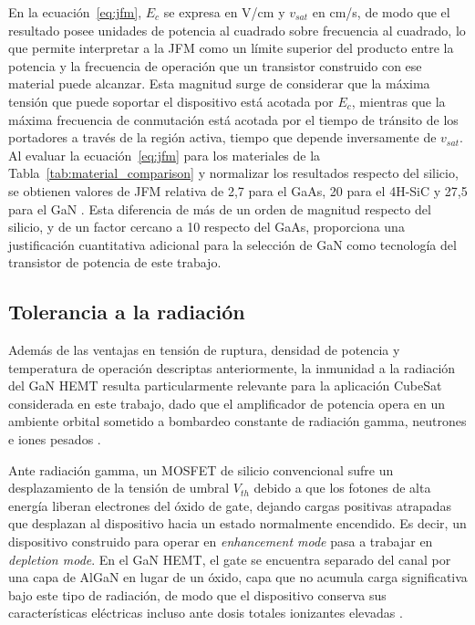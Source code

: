 En la ecuación~\eqref{eq:jfm}, $E_c$ se expresa en V/cm y $v_{sat}$ en cm/s, de modo que el resultado posee unidades de potencia al cuadrado sobre frecuencia al cuadrado, lo que permite interpretar a la JFM como un límite superior del producto entre la potencia y la frecuencia de operación que un transistor construido con ese material puede alcanzar. Esta magnitud surge de considerar que la máxima tensión que puede soportar el dispositivo está acotada por $E_c$, mientras que la máxima frecuencia de conmutación está acotada por el tiempo de tránsito de los portadores a través de la región activa, tiempo que depende inversamente de $v_{sat}$. Al evaluar la ecuación~\eqref{eq:jfm} para los materiales de la Tabla~\ref{tab:material_comparison} y normalizar los resultados respecto del silicio, se obtienen valores de JFM relativa de 2{,}7 para el GaAs, 20 para el 4H-SiC y 27{,}5 para el GaN \cite{mishra2008}. Esta diferencia de más de un orden de magnitud respecto del silicio, y de un factor cercano a 10 respecto del GaAs, proporciona una justificación cuantitativa adicional para la selección de GaN como tecnología del transistor de potencia de este trabajo.

\subsection{Tolerancia a la radiación}
Además de las ventajas en tensión de ruptura, densidad de potencia y temperatura de operación descriptas anteriormente, la inmunidad a la radiación del GaN HEMT resulta particularmente relevante para la aplicación CubeSat considerada en este trabajo, dado que el amplificador de potencia opera en un ambiente orbital sometido a bombardeo constante de radiación gamma, neutrones e iones pesados \cite{epcspace2022}.

Ante radiación gamma, un MOSFET de silicio convencional sufre un desplazamiento de la tensión de umbral $V_{th}$ debido a que los fotones de alta energía liberan electrones del óxido de gate, dejando cargas positivas atrapadas que desplazan al dispositivo hacia un estado normalmente encendido. Es decir, un dispositivo construido para operar en \textit{enhancement mode} pasa a trabajar en \textit{depletion mode}. En el GaN HEMT, el gate se encuentra separado del canal por una capa de AlGaN en lugar de un óxido, capa que no acumula carga significativa bajo este tipo de radiación, de modo que el dispositivo conserva sus características eléctricas incluso ante dosis totales ionizantes elevadas \cite{epcspace2022}.

